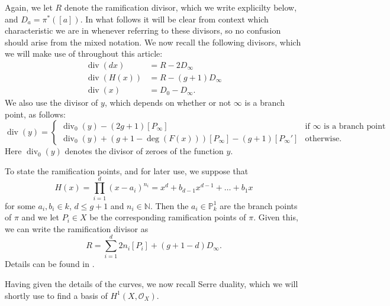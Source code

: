\documentclass[draft, 11pt]{article} %
\theoremstyle{plain}
\theoremstyle{remark}
\newcommand{\hone}{H^1(X,\mathcal{O}_X)}
\DeclareMathOperator{\di}{div}
\begin{document}
Again, we let $R$ denote the ramification divisor, which we write explicilty below, and $D_a = \pi^*([a])$.
In what follows it will be clear from context which characteristic we are in whenever referring to these divisors, so no confusion should arise from the mixed notation.
We now recall the following divisors, which we will make use of throughout this article:
\begin{align}
\di (dx) & = R - 2D_\infty \label{divdxp=2}\\
\di (H(x)) & = R - (g+1)D_\infty \label{divhp=2}\\
\di (x) & = D_0 - D_\infty \label{divxp=2}.
\end{align}
We also use the divisor of $y$, which depends on whether or not $\infty$ is a branch point, as follows:
\begin{equation}\label{divyp=2}
\di(y) = \begin{cases}
 \di_0(y) -(2g+1)[P_\infty] & \text{if $\infty$ is a branch point} \\
 \di_0(y) +(g+1-\deg(F(x)))[P_\infty] - (g+1)[P_\infty'] & \text{otherwise.}
\end{cases}
\end{equation}
Here $\di_0(y)$ denotes the divisor of zeroes of the function $y$.


To state the ramification points, and for later use, we suppose that 
\begin{equation}\label{hcoefficients}
H(x) = \prod_{i=1}^d (x-a_i)^{n_i} = x^d + b_{d-1}x^{d-1} + \ldots + b_1x
\end{equation}
for some $a_i, b_i \in  k$, $d \leq g+1$ and $n_i \in \mathbb N$.
Then the $a_i \in \mathbb P_k^1$ are the branch points of $\pi$ and we let $P_i \in X$ be the corresponding ramification points of $\pi$.
Given this, we can write the ramification divisor as
\[
R = \sum_{i=1}^d 2n_i[P_i] + (g+1-d)D_\infty.
\]
Details can be found in \cite[\S 6]{faithfulaction}.

Having given the details of the curves, we now recall Serre duality, which we will shortly use to find a basis of $\hone$.
\end{document}

